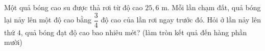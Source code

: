 \begin{ex}
Một quả bóng cao su được thả rơi từ độ cao $25{,}6$ m. Mỗi lần chạm đất, quả bóng lại nảy lên một độ cao bằng $\dfrac34$ độ cao của lần rơi ngay trước đó. Hỏi ở lần nảy lên thứ $4$, quả bóng đạt độ cao bao nhiêu mét? (làm tròn kết quả đến hàng phần mười)
\end{ex}

